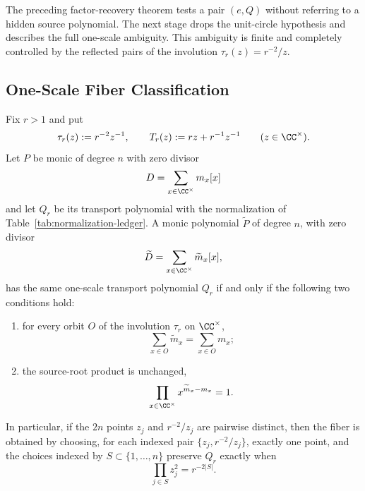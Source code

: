 The preceding factor-recovery theorem tests a pair \((e,Q)\) without referring to a hidden source polynomial.  The next stage drops the unit-circle hypothesis and describes the full one-scale ambiguity.  This ambiguity is finite and completely controlled by the reflected pairs of the involution \(\tau_r(z)=r^{-2}/z\).

\subsection{One-Scale Fiber Classification}\label{subsec:one-scale-fiber-classification}

\begin{lemma}\label{lem:one-scale-orbit-fiber-matching}
Fix \(r>1\) and put
\[
\tau_r(z):=r^{-2}z^{-1},
\qquad
T_r(z):=rz+r^{-1}z^{-1}
\qquad(z\in\CC^\times).
\]
Let \(P\) be monic of degree \(n\) with zero divisor
\[
D=\sum_{x\in\CC^\times}m_x[x]
\]
and let \(Q_r\) be its transport polynomial with the normalization of Table~\ref{tab:normalization-ledger}.  A monic polynomial \(\widetilde P\) of degree \(n\), with zero divisor
\[
\widetilde D=\sum_{x\in\CC^\times}\widetilde m_x[x],
\]
has the same one-scale transport polynomial \(Q_r\) if and only if the following two conditions hold:
\begin{enumerate}[label=\textup{(\alph*)}]
  \item for every orbit \(O\) of the involution \(\tau_r\) on \(\CC^\times\),
  \[
  \sum_{x\in O}\widetilde m_x=\sum_{x\in O}m_x;
  \]
  \item the source-root product is unchanged,
  \[
  \prod_{x\in\CC^\times}x^{\widetilde m_x-m_x}=1.
  \]
\end{enumerate}
In particular, if the \(2n\) points \(z_j\) and \(r^{-2}/z_j\) are pairwise distinct, then the fiber is obtained by choosing, for each indexed pair \(\{z_j,r^{-2}/z_j\}\), exactly one point, and the choices indexed by \(S\subset\{1,\dots,n\}\) preserve \(Q_r\) exactly when
\[
\prod_{j\in S}z_j^2=r^{-2|S|}.
\]
\end{lemma}

